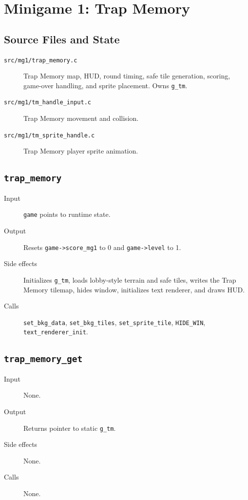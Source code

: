 \section{Minigame 1: Trap Memory}

\subsection{Source Files and State}

\begin{description}
  \item[\texttt{src/mg1/trap\_memory.c}] Trap Memory map, HUD, round timing, safe tile generation, scoring, game-over handling, and sprite placement. Owns \texttt{g\_tm}.
  \item[\texttt{src/mg1/tm\_handle\_input.c}] Trap Memory movement and collision.
  \item[\texttt{src/mg1/tm\_sprite\_handle.c}] Trap Memory player sprite animation.
\end{description}

\subsection*{\texttt{trap\_memory}}
\begin{description}
  \item[Input] \texttt{game} points to runtime state.
  \item[Output] Resets \texttt{game->score\_mg1} to 0 and \texttt{game->level} to 1.
  \item[Side effects] Initializes \texttt{g\_tm}, loads lobby-style terrain and safe tiles, writes the Trap Memory tilemap, hides window, initializes text renderer, and draws HUD.
  \item[Calls] \texttt{set\_bkg\_data}, \texttt{set\_bkg\_tiles}, \texttt{set\_sprite\_tile}, \texttt{HIDE\_WIN}, \texttt{text\_renderer\_init}.
\end{description}

\subsection*{\texttt{trap\_memory\_get}}
\begin{description}
  \item[Input] None.
  \item[Output] Returns pointer to static \texttt{g\_tm}.
  \item[Side effects] None.
  \item[Calls] None.
\end{description}

